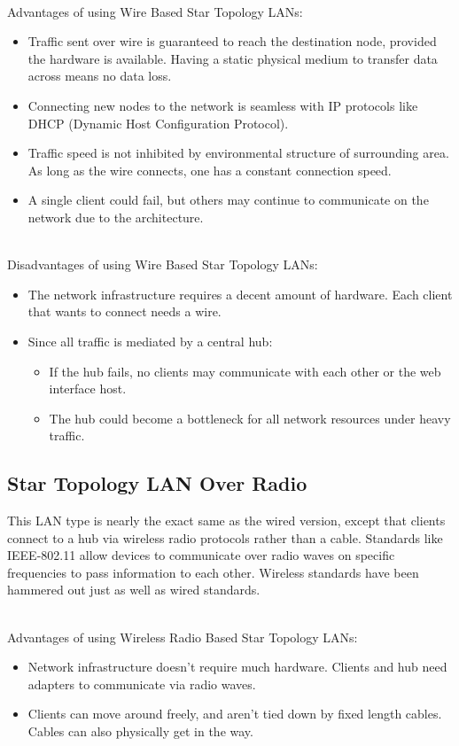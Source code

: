 \documentclass[onecolumn, draftclsnofoot,10pt, compsoc]{IEEEtran}
\begin{document}
		\noindent \\Advantages of using Wire Based Star Topology LANs:
		\begin{itemize}
			\item Traffic sent over wire is guaranteed to reach the destination node, provided the hardware is available.  Having a static physical medium to transfer data across means no data loss.
			\item Connecting new nodes to the network is seamless with IP protocols like DHCP (Dynamic Host Configuration Protocol).
			\item Traffic speed is not inhibited by environmental structure of surrounding area.  As long as the wire connects, one has a constant connection speed.
			\item A single client could fail, but others may continue to communicate on the network due to the architecture.
		\end{itemize}

		\noindent \\Disadvantages of using Wire Based Star Topology LANs:
		\begin{itemize}
			\item The network infrastructure requires a decent amount of hardware.  Each client that wants to connect needs a wire.
			\item Since all traffic is mediated by a central hub:
			\begin{itemize}
				\item If the hub fails, no clients may communicate with each other or the web interface host.
				\item The hub could become a bottleneck for all network resources under heavy traffic.
			\end{itemize}
		\end{itemize}

		\subsection{Star Topology LAN Over Radio}
		This LAN type is nearly the exact same as the wired version, except that clients connect to a hub via wireless radio protocols rather than a cable.
		Standards like IEEE-802.11 allow devices to communicate over radio waves on specific frequencies to pass information to each other.\cite{LAN3}
		Wireless standards have been hammered out just as well as wired standards.

		\noindent \\Advantages of using Wireless Radio Based Star Topology LANs:
		\begin{itemize}
			\item Network infrastructure doesn't require much hardware.  Clients and hub need adapters to communicate via radio waves.
			\item Clients can move around freely, and aren't tied down by fixed length cables.  Cables can also physically get in the way.
		\end{itemize}
\end{document}
